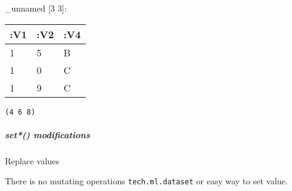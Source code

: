 \documentclass[]{article}
\newenvironment{Shaded}{\begin{snugshade}}{\end{snugshade}}
\newcommand{\AttributeTok}[1]{\textcolor[rgb]{0.77,0.63,0.00}{#1}}
\newcommand{\BuiltInTok}[1]{#1}
\newcommand{\DecValTok}[1]{\textcolor[rgb]{0.00,0.00,0.81}{#1}}
\newcommand{\FunctionTok}[1]{\textcolor[rgb]{0.00,0.00,0.00}{#1}}
\newcommand{\KeywordTok}[1]{\textcolor[rgb]{0.13,0.29,0.53}{\textbf{#1}}}
\newcommand{\NormalTok}[1]{#1}
\newcommand{\StringTok}[1]{\textcolor[rgb]{0.31,0.60,0.02}{#1}}
\newcommand{\VariableTok}[1]{\textcolor[rgb]{0.00,0.00,0.00}{#1}}
\let\oldsubparagraph\subparagraph
\renewcommand{\subparagraph}[1]{\oldsubparagraph{#1}\mbox{}}
\begin{document}
\begin{Shaded}
\end{Shaded}

\_unnamed {[}3 3{]}:

\begin{longtable}[]{@{}lll@{}}
\toprule
:V1 & :V2 & :V4\tabularnewline
\midrule
\endhead
1 & 5 & B\tabularnewline
1 & 0 & C\tabularnewline
1 & 9 & C\tabularnewline
\bottomrule
\end{longtable}

\begin{Shaded}
\end{Shaded}

\begin{verbatim}
(4 6 8)
\end{verbatim}

\hypertarget{set-modifications}{%
\subparagraph{set*() modifications}\label{set-modifications}}

Replace values

There is no mutating operations \texttt{tech.ml.dataset} or easy way to
set value.

\begin{Shaded}
\end{Shaded}
\end{document}

